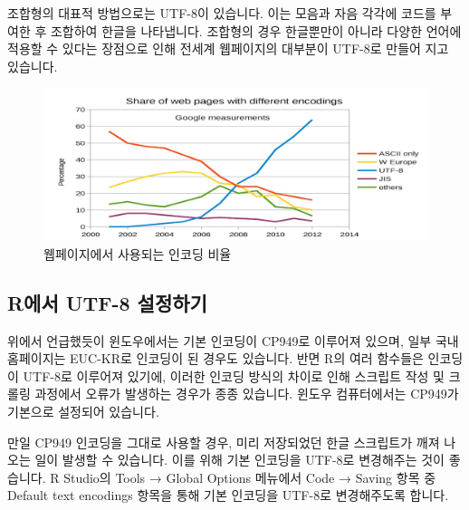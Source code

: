 \documentclass[]{book}
\begin{document}
조합형의 대표적 방법으로는 UTF-8이 있습니다. 이는 모음과 자음 각각에 코드를 부여한 후 조합하여 한글을 나타냅니다. 조합형의 경우 한글뿐만이 아니라 다양한 언어에 적용할 수 있다는 장점으로 인해 전세계 웹페이지의 대부분이 UTF-8로 만들어 지고 있습니다.

\begin{figure}

{\centering \includegraphics{images/encoding_ratio} 

}

\caption{웹페이지에서 사용되는 인코딩 비율}\label{fig:unnamed-chunk-2}
\end{figure}

\hypertarget{r-utf-8--1}{%
\subsection{R에서 UTF-8 설정하기}\label{r-utf-8--1}}

위에서 언급했듯이 윈도우에서는 기본 인코딩이 CP949로 이루어져 있으며, 일부 국내 홈페이지는 EUC-KR로 인코딩이 된 경우도 있습니다. 반면 R의 여러 함수들은 인코딩이 UTF-8로 이루어져 있기에, 이러한 인코딩 방식의 차이로 인해 스크립트 작성 및 크롤링 과정에서 오류가 발생하는 경우가 종종 있습니다. 윈도우 컴퓨터에서는 CP949가 기본으로 설정되어 있습니다.

만일 CP949 인코딩을 그대로 사용할 경우, 미리 저장되었던 한글 스크립트가 깨져 나오는 일이 발생할 수 있습니다. 이를 위해 기본 인코딩을 UTF-8로 변경해주는 것이 좋습니다. R Studio의 Tools → Global Options 메뉴에서 Code → Saving 항목 중 Default text encodings 항목을 통해 기본 인코딩을 UTF-8로 변경해주도록 합니다.
\end{document}

